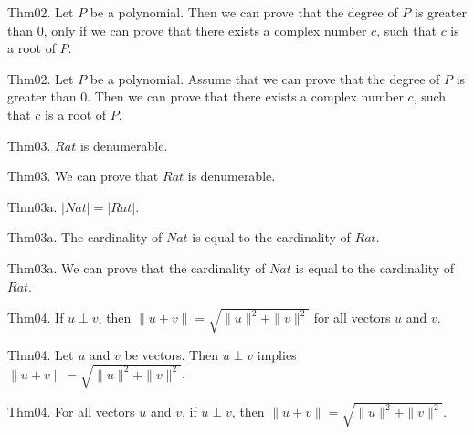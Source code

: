 \documentclass{article}
\begin{document}
Thm02. Let $P$ be a polynomial. Then we can prove that the degree of $P$ is greater than $0$, only if we can prove that there exists a complex number $c$, such that $c$ is a root of $P$.

Thm02. Let $P$ be a polynomial. Assume that we can prove that the degree of $P$ is greater than $0$. Then we can prove that there exists a complex number $c$, such that $c$ is a root of $P$.

Thm03. $Rat$ is denumerable.

Thm03. We can prove that $Rat$ is denumerable.

Thm03a. $| Nat | = | Rat |$.

Thm03a. The cardinality of $Nat$ is equal to the cardinality of $Rat$.

Thm03a. We can prove that the cardinality of $Nat$ is equal to the cardinality of $Rat$.

Thm04. If $u \perp v$, then $\| u + v \| = \sqrt{ \| u \| ^{ 2}+ \| v \| ^{ 2}}$ for all vectors $u$ and $v$.

Thm04. Let $u$ and $v$ be vectors. Then $u \perp v$ implies $\| u + v \| = \sqrt{ \| u \| ^{ 2}+ \| v \| ^{ 2}}$.

Thm04. For all vectors $u$ and $v$, if $u \perp v$, then $\| u + v \| = \sqrt{ \| u \| ^{ 2}+ \| v \| ^{ 2}}$.
\end{document}
